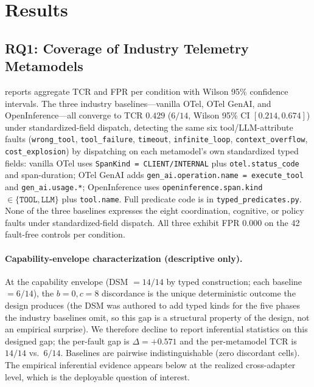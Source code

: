 \documentclass[a4paper,UKenglish,cleveref,autoref,thm-restate]{lipics-v2021}
\begin{document}
\section{Results}
\label{sec:results}

\subsection{RQ1: Coverage of Industry Telemetry Metamodels}

 reports aggregate TCR and FPR per condition with
Wilson 95\% confidence intervals.  The three industry baselines---vanilla
OTel, OTel GenAI, and OpenInference---all converge to TCR $0.429$
($6/14$, Wilson 95\% CI $[0.214, 0.674]$) under standardized-field dispatch,
detecting the same six tool/LLM-attribute faults
(\texttt{wrong\_tool}, \texttt{tool\_failure}, \texttt{timeout},
\texttt{infinite\_loop}, \texttt{context\_overflow},
\texttt{cost\_explosion}) by dispatching on each metamodel's own
standardized typed fields: vanilla OTel uses
\texttt{SpanKind = CLIENT/INTERNAL} plus \texttt{otel.status\_code}
and span-duration; OTel GenAI adds
\texttt{gen\_ai.operation.name = execute\_tool} and
\texttt{gen\_ai.usage.*}; OpenInference uses
\texttt{openinference.span.kind} $\in \{\texttt{TOOL}, \texttt{LLM}\}$
plus \texttt{tool.name}.  Full predicate code is in
\texttt{typed\_predicates.py}.  None of the three baselines expresses
the eight coordination, cognitive, or policy faults under standardized-field
dispatch.  All three exhibit FPR
$0.000$ on the 42 fault-free controls per condition.

\paragraph*{Capability-envelope characterization (descriptive only).}
At the capability envelope (DSM $= 14/14$ by typed construction;
each baseline $= 6/14$), the $b{=}0, c{=}8$ discordance is the
unique deterministic outcome the design produces (the DSM was
authored to add typed kinds for the five phases the industry
baselines omit, so this gap is a structural property of the design,
not an empirical surprise). We therefore decline to report inferential
statistics on this designed gap; the per-fault gap is $\Delta = +0.571$
and the per-metamodel TCR is $14/14$ vs.\ $6/14$. Baselines are
pairwise indistinguishable (zero discordant cells). The empirical
inferential evidence appears below at the realized cross-adapter
level, which is the deployable question of interest.
\end{document}

